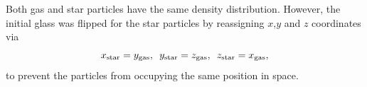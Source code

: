 \documentclass[fleq,usenatbib]{mnras}
\begin{document}
Both gas and star particles have the same density distribution. However, 
the initial glass was flipped for the star particles by reassigning $x$,$y$ 
and $z$ coordinates via
 \begin{equation}
 x_{\rm star} = y_{\rm gas}, \hspace{5pt} y_{\rm star} = z_{\rm gas}, 
 \hspace{5pt} z_{\rm star} = x_{\rm gas},
 \end{equation}
to prevent the particles from occupying the same position in space.

\bsp
\label{lastpage}
\end{document}
